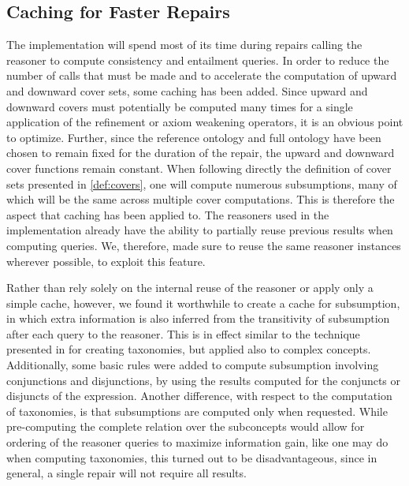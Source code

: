 \subsection{Caching for Faster Repairs}\label{cache-impl}

The implementation will spend most of its time during repairs calling the reasoner to compute consistency and entailment queries. In order to reduce the number of calls that must be made and to accelerate the computation of upward and downward cover sets, some caching has been added. Since upward and downward covers must potentially be computed many times for a single application of the refinement or axiom weakening operators, it is an obvious point to optimize. Further, since the reference ontology and full ontology have been chosen to remain fixed for the duration of the repair, the upward and downward cover functions remain constant. When following directly the definition of cover sets presented in \cref{def:covers}, one will compute numerous subsumptions, many of which will be the same across multiple cover computations. This is therefore the aspect that caching has been applied to. The reasoners used in the implementation already have the ability to partially reuse previous results when computing queries. We, therefore, made sure to reuse the same reasoner instances wherever possible, to exploit this feature.

Rather than rely solely on the internal reuse of the reasoner or apply only a simple cache, however, we found it worthwhile to create a cache for subsumption, in which extra information is also inferred from the transitivity of subsumption after each query to the reasoner. This is in effect similar to the technique presented in \cite{shearer2009exploiting} for creating taxonomies, but applied also to complex concepts. Additionally, some basic rules were added to compute subsumption involving conjunctions and disjunctions, by using the results computed for the conjuncts or disjuncts of the expression. Another difference, with respect to the computation of taxonomies, is that subsumptions are computed only when requested. While pre-computing the complete relation over the subconcepts would allow for ordering of the reasoner queries to maximize information gain, like one may do when computing taxonomies, this turned out to be disadvantageous, since in general, a single repair will not require all results. 


